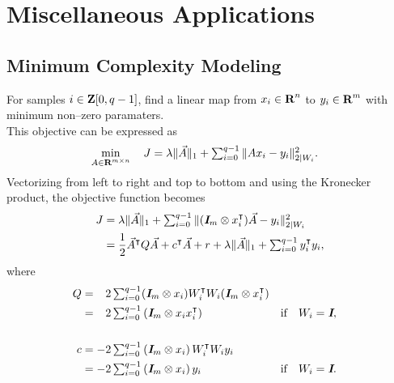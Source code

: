 \documentclass{article}
\begin{document}

\clearpage


\section{Miscellaneous Applications}

\subsection{Minimum Complexity Modeling}

    For samples $i\in\textbf{Z}[0,q-1]$, find a linear map from $x_i\in\textbf{R}^n$ 
    to $y_i\in\textbf{R}^m$ with minimum non--zero paramaters. \\
    This objective can be expressed as
    \begin{align}
            \min_{A\in\textbf{R}^{m\times n}}
        \quad 
        J
        &=
        \lambda\|\vec{A }\|_1
        +
        \textstyle\sum_{i=0}^{q-1} \| A  x_i - y_i \|_{2|W_i}^2.
    \end{align}
    Vectorizing from left to right and top to bottom and using the Kronecker product, 
    the objective function becomes
    \begin{align*}
        J
        &=
        \lambda\|\vec{A }\|_1
        +
        \textstyle\sum_{i=0}^{q-1} \|(\emph{\textbf{I}}_m\otimes x_i^\intercal)\vec{A} - y_i\|_{2|W_i}^2\\
        &=
        \frac{1}{2}
        \vec{A}^\intercal Q \vec{A} + c^\intercal \vec{A} + r + \lambda\|\vec{A}\|_1
        +\textstyle\sum_{i=0}^{q-1} y_i^\intercal y_i,
    \end{align*}
    where
    \begin{align*}
        Q&=\minus 2\textstyle\sum_{i=0}^{q-1} 
                (\eye_m\otimes x_i)W_i^\tp W_i(\eye_m\otimes x_i^\tp)
            \\
            &=\minus 2\textstyle\sum_{i=0}^{q-1} 
                \left(\eye_m\otimes x_ix_i^\tp\right)
                &&\text{if}\quad W_i=\eye,
        \\\\
            c &=-2\textstyle\sum_{i=0}^{q-1} 
                \left(\eye_m\otimes x_i\right)W_i^\tp W_iy_i\\
                &=-2\textstyle\sum_{i=0}^{q-1} 
                \left(\eye_m\otimes x_i\right)y_i&&\text{if}\quad W_i=\eye.
    \end{align*} 
\end{document}
